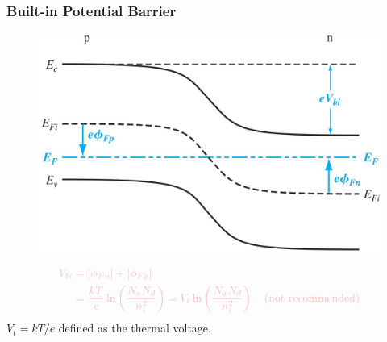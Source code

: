\documentclass{beamer}
\begin{document}
    \begin{frame}[t] \frametitle{Built-in Potential Barrier}
        \begin{figure}[H]
            \centering
            \includegraphics[width=0.5\linewidth]{pn-junction-energy-band-diagram.jpg}
            \label{fig:pn-junction-energy-band-diagram-2.jpg}
        \end{figure}
        \begin{equation*}
            \color{pink}
            \begin{aligned}
                V_{bi} &= |\phi_{Fn}| + |\phi_{Fp}| \\
                &= \frac{kT}{e} \ln \left( \frac{N_a N_d}{n_i^2}  \right) = V_t \ln\left( \frac{N_a N_d}{n_i^2}  \right) \quad (\text{not recommended})
            \end{aligned}
        \end{equation*}
        $V_t = kT / e$ defined as the thermal voltage.
    \end{frame}
\end{document}
